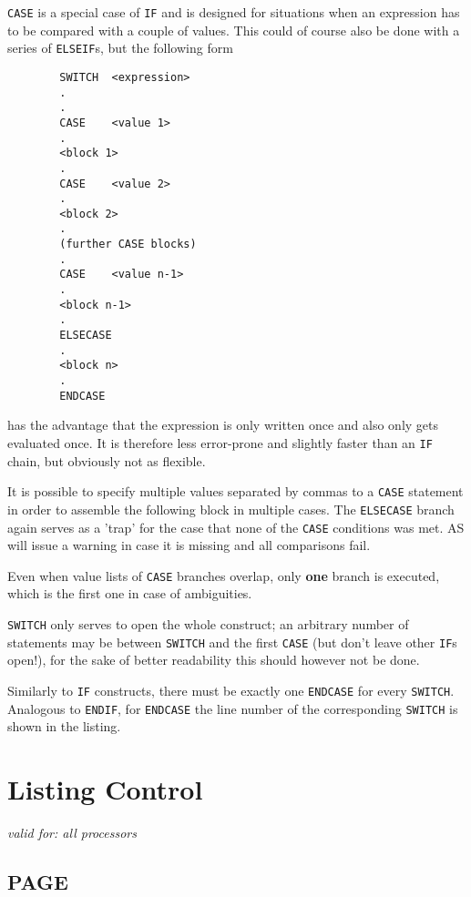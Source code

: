 \documentclass[12pt,twoside]{report}
\makeatletter
\newcommand{\bb}[1]{{\bf #1}}
\newcommand{\tty}[1]{{\tt #1}}
\newcommand{\ttindex}[1]{\index{#1@{\tt #1}}}
\makeatother
\begin{document}
\tty{CASE} is a special case of \tty{IF} and is designed for situations
when an expression has to be compared with a couple of values.  This could
of course also be done with a series of \tty{ELSEIF}s, but the following
form
\begin{verbatim}
        SWITCH  <expression>
        .
        .
        CASE    <value 1>
        .
        <block 1>
        .
        CASE    <value 2>
        .
        <block 2>
        .
        (further CASE blocks)
        .
        CASE    <value n-1>
        .
        <block n-1>
        .
        ELSECASE
        .
        <block n>
        .
        ENDCASE
\end{verbatim}
has the advantage that the expression is only written once and also only
gets evaluated once.  It is therefore less error-prone and slightly faster
than an \tty{IF} chain, but obviously not as flexible.

It is possible to specify multiple values separated by commas to a
\tty{CASE} statement in order to assemble the following block in multiple
cases.  The \tty{ELSECASE} branch again serves as a 'trap' for the case
that none of the \tty{CASE} conditions was met.  AS will issue a warning
in case it is missing and all comparisons fail.

Even when value lists of \tty{CASE} branches overlap, only \bb{one} branch
is executed, which is the first one in case of ambiguities.

\tty{SWITCH} only serves to open the whole construct; an arbitrary number
of statements may be between \tty{SWITCH} and the first \tty{CASE} (but
don't leave other \tty{IF}s open!), for the sake of better readability
this should however not be done.

Similarly to {\tt IF} constructs, there must be exactly one {\tt ENDCASE}
for every {\tt SWITCH}.  Analogous to {\tt ENDIF}, for {\tt ENDCASE} the
line number of the corresponding {\tt SWITCH} is shown in the listing.


\section{Listing Control}

{\em valid for: all processors}


\subsection{PAGE}
\ttindex{PAGE}
\end{document}

